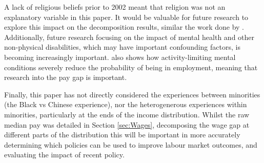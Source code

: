 \documentclass[class=article, crop=false]{standalone}
\begin{document}
A lack of religious beliefs prior to 2002 meant that religion was not an explanatory variable in this paper. It would be valuable for future research to explore this impact on the decomposition results, similar the work done by \citet{Longhi}. Additionally, future research focusing on the impact of mental health and other non-physical disabilities, which may have important confounding factors, is becoming increasingly important. \citep{Longhi} also shows how activity-limiting mental conditions severely reduce the probability of being in employment, meaning that research into the pay gap is important.

Finally, this paper has not directly considered the experiences between minorities (the Black vs Chinese experience), nor the heterogenerous experiences within minorities, particularly at the ends of the income distribution. Whilst the raw median pay was detailed in Section \ref{sec:Wages}, decomposing the wage gap at different parts of the distribution this will be important in more accurately determining which policies can be used to improve labour market outcomes, and evaluating the impact of recent policy.

\ifstandalone

\fi
\end{document}

